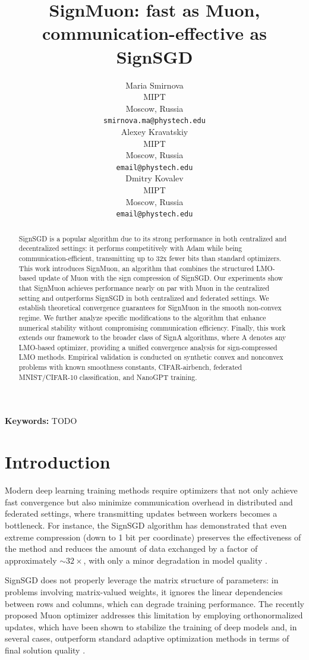 \documentclass{article}
\title{SignMuon: fast as Muon, communication-effective as SignSGD}
\author{
  Maria Smirnova\\
  MIPT\\
  Moscow, Russia\\
  \texttt{smirnova.ma@phystech.edu}\\
  \And
  Alexey Kravatskiy \\
  MIPT\\
  Moscow, Russia\\
  \texttt{email@phystech.edu}\\
\And
  Dmitry Kovalev\\
  MIPT\\
  Moscow, Russia\\
  \texttt{email@phystech.edu}\\
}
\begin{document}
\maketitle

\begin{abstract}
SignSGD is a popular algorithm due to its strong performance in both centralized and decentralized settings: it performs competitively with Adam while being communication-efficient, transmitting up to 32x fewer bits than standard optimizers. This work introduces SignMuon, an algorithm that combines the structured LMO-based update of Muon with the sign compression of SignSGD. Our experiments show that SignMuon achieves performance nearly on par with Muon in the centralized setting and outperforms SignSGD in both centralized and federated settings. We establish theoretical convergence guarantees for SignMuon in the smooth non-convex regime. We further analyze specific modifications to the algorithm that enhance numerical stability without compromising communication efficiency. Finally, this work extends our framework to the broader class of SignA algorithms, where A denotes any LMO-based optimizer, providing a unified convergence analysis for sign-compressed LMO methods. Empirical validation is conducted on synthetic convex and nonconvex problems with known smoothness constants, CIFAR-airbench, federated MNIST/CIFAR-10 classification, and NanoGPT training.
    
\end{abstract}

\textbf{Keywords:} TODO


\section{Introduction}
Modern deep learning training methods require optimizers that not only achieve fast convergence but also minimize communication overhead in distributed and federated settings, where transmitting updates between workers becomes a bottleneck. For instance, the SignSGD algorithm has demonstrated that even extreme compression (down to 1 bit per coordinate) preserves the effectiveness of the method and reduces the amount of data exchanged by a factor of approximately $\sim32\times$, with only a minor degradation in model quality \cite{bernstein2018signsgd, bernstein2019majority}.

SignSGD does not properly leverage the matrix structure of parameters: in problems involving matrix-valued weights, it ignores the linear dependencies between rows and columns, which can degrade training performance. The recently proposed Muon optimizer addresses this limitation by employing orthonormalized updates, which have been shown to stabilize the training of deep models and, in several cases, outperform standard adaptive optimization methods in terms of final solution quality \cite{bernstein2024oldoptimizer, jordan2024muon, shah2025practical}.
\end{document}
